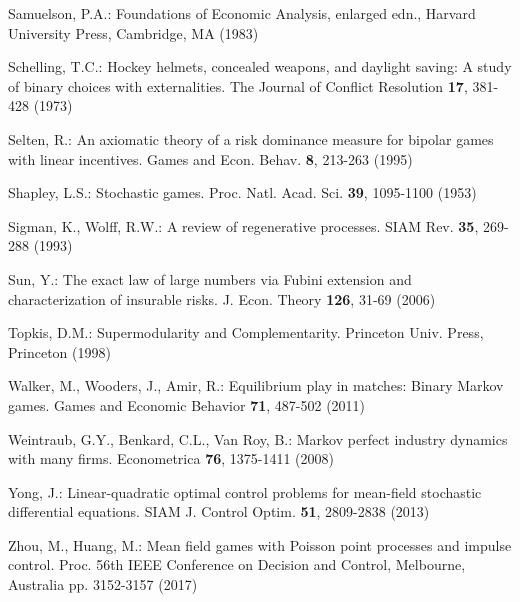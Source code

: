 \begin{thebibliography}{99.}
Samuelson, P.A.: Foundations of Economic Analysis, enlarged edn., Harvard University Press, Cambridge, MA (1983)

Schelling, T.C.: Hockey helmets, concealed weapons, and daylight saving: A study of binary
choices with externalities. The Journal of Conflict Resolution \textbf{17}, 381-428 (1973)



Selten, R.: An axiomatic theory of a risk dominance measure
for bipolar games with linear incentives. Games and Econ. Behav. \textbf{8}, 213-263 (1995)


 Shapley, L.S.: Stochastic games. Proc. Natl. Acad. Sci. \textbf{39}, 1095-1100 (1953)



Sigman, K., Wolff, R.W.: A review of regenerative processes. SIAM Rev. \textbf{35}, 269-288 (1993)


Sun, Y.: The exact law of large numbers via Fubini extension and
characterization of insurable risks. J. Econ. Theory \textbf{126}, 31-69 (2006)

Topkis, D.M.: Supermodularity and Complementarity.  Princeton Univ. Press,
Princeton (1998)



 Walker, M.,  Wooders, J.,   Amir, R.:
Equilibrium play in matches: Binary Markov games. Games and Economic Behavior \textbf{71}, 487-502 (2011)

Weintraub, G.Y., Benkard, C.L., Van Roy, B.:  Markov perfect
industry dynamics with many firms. Econometrica \textbf{76}, 1375-1411 (2008)


Yong, J.: Linear-quadratic optimal control problems for mean-field stochastic differential
equations. SIAM J. Control Optim.  \textbf{51},  2809-2838 (2013)



Zhou, M., Huang, M.: Mean field games with Poisson point processes and impulse control. Proc. 56th IEEE Conference on Decision and Control, Melbourne, Australia  pp. 3152-3157 (2017)



\end{thebibliography}
